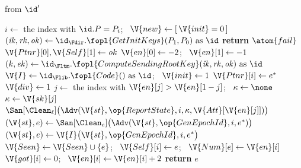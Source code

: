 \begin{interface}
{ \quad from $\id'$
\begin{algorithmic}[1]
\algcont
{}
\State $i \gets$ the index with $\id.P = P_i$; \ $\V{new} \gets [\, \V{init} = 0 \,]$
   \label{ln:ckeinitiator}
  \State $(\mathit{ik}, \mathit{rk}, \mathit{ok}) \gets \id_{\Fdir}.\fopl{GetInitKeys}(P_1, P_0) \text{ as } \id$
    \State \textbf{return} $\atom{fail}$ \label{ln:ckeprekey}
  \EndIf
  \State $\V{Ptnr}[0], \V{Self}[1] \gets \mathit{ok}$ \label{ln:ckeprekeyid}
  \State $\V{en}[0] \gets -2$; \ $\V{en}[1] \gets -1$ \label{ln:ckeoffset}
  \State $(k, \mathit{ek}) \gets \id_{\Fltm}.\fopl{ComputeSendingRootKey}(\mathit{ik}, \mathit{rk}, \mathit{ok}) \text{ as } \id$ \label{ln:ckerootkey}
  \State $\V{I} \gets \id_{\Flib}.\fopl{Code}() \text{ as } \id$; \ $\V{init} \gets 1$
\EndIf
{}
  \State $\V{Ptnr}[i] \gets e^{*}$
\EndIf
{} \label{ln:ckediverge}
  \State $\V{div} \gets 1$
  \State $j \gets$ the index with $\V{en}[j] > \V{en}[1-j]$; \ $\kappa \gets \none$ \label{ln:ckeahead}
    \State $\kappa \gets \V{sk}[j]$
  \EndIf
  \State $\San[\Clean_{\ell}]\bigl(\Adv(\V{st}, \op{ReportState}, i, \kappa, \V{Att}[\V{en}[j]])\bigr)$ \label{ln:ckehandover}
\EndIf
{} \label{ln:ckecompromised}
  \State $(\V{st}, e) \gets \San[\Clean_{e}]\bigl(\Adv(\V{st}, \op{GenEpochId}, i, e^{*})\bigr)$ \label{ln:ckeadvid}
\EndIf
{}
  \State $(\V{st}, e) \gets \V{I}\bigl(\V{st}, \op{GenEpochId}, i, e^{*}\bigr)$ \label{ln:ckehonestid}
\EndIf
{} \label{ln:ckefresh}
\State $\V{Seen} \gets \V{Seen} \cup \{e\}$; \ $\V{Self}[i] \gets e$; \ $\V{Num}[e] \gets \V{en}[i]$
\State $\V{got}[i] \gets 0$; \ $\V{en}[i] \gets \V{en}[i] + 2$ \label{ln:ckestep}
\State \textbf{return} $e$
\algsave
\end{algorithmic}
\vspace{1.4ex}

}
\end{interface}
